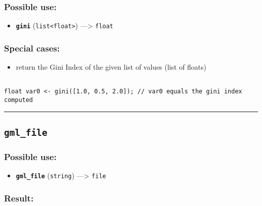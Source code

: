\documentclass[]{book}
\providecommand{\tightlist}{%
  \setlength{\itemsep}{0pt}\setlength{\parskip}{0pt}}
\theoremstyle{definition}
\theoremstyle{definition}
\theoremstyle{definition}
\theoremstyle{remark}
\begin{document}
\subsubsection{Possible use:}\label{possible-use-237}

\begin{itemize}
\tightlist
\item
  \textbf{\texttt{gini}} (\texttt{list\textless{}float\textgreater{}})
  ---\textgreater{} \texttt{float}
\end{itemize}

\subsubsection{Special cases:}\label{special-cases-72}

\begin{itemize}
\tightlist
\item
  return the Gini Index of the given list of values (list of floats)
\end{itemize}

\begin{verbatim}
 
float var0 <- gini([1.0, 0.5, 2.0]); // var0 equals the gini index computed
\end{verbatim}

\begin{center}\rule{0.5\linewidth}{\linethickness}\end{center}

\subsection{\texorpdfstring{\texttt{gml\_file}}{gml\_file}}\label{gml_file}

\subsubsection{Possible use:}\label{possible-use-238}

\begin{itemize}
\tightlist
\item
  \textbf{\texttt{gml\_file}} (\texttt{string}) ---\textgreater{}
  \texttt{file}
\end{itemize}

\subsubsection{Result:}\label{result-229}
\end{document}
